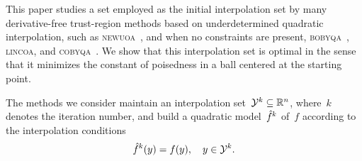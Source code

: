 \documentclass[draft]{article}
\numberwithin{equation}{section}
\theoremstyle{definition}
\theoremstyle{plain}
\theoremstyle{remark}
\newcommand*{\obj}{f}
\newcommand*{\objm}[1][]{\hat{\obj}\ifblank{#1}{}{^{#1}}}
\newcommand*{\R}{\mathbb{R}}
\newcommand*{\solvername}[1]{\textsc{#1}\xspace}
\newcommand*{\xpt}[1][]{\mathcal{Y}\ifblank{#1}{}{^{#1}}}
\begin{document}
This paper studies a set employed as the initial interpolation set by many derivative-free trust-region methods based on underdetermined quadratic interpolation, such as \solvername{newuoa}~\cite{Powell_2006}, and when no constraints are present, \solvername{bobyqa}~\cite{Powell_2009}, \solvername{lincoa}, and \solvername{cobyqa}~\cite{Ragonneau_2022,Ragonneau_Zhang_2023}.
We show that this interpolation set is optimal in the sense that it minimizes the constant of poisedness in a ball centered at the starting point.

%
The methods we consider maintain an interpolation set~$\xpt[k] \subseteq \R^n$, where~$k$ denotes the iteration number, and build a quadratic model~$\objm[k]$ of~$\obj$ according to the interpolation conditions
\begin{equation}
    \label{eq:intp-cond}
    \objm[k](y) = \obj(y), \quad y \in \xpt[k].
\end{equation}
\end{document}
